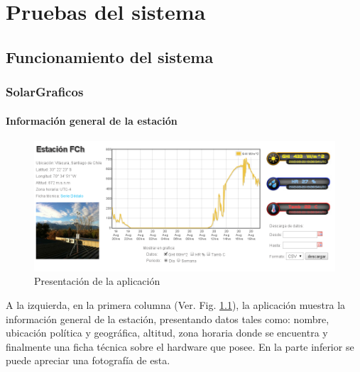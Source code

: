\chapter{Pruebas del sistema}
\label{pruebas}

\section{Funcionamiento del sistema}
\subsection{SolarGraficos}
\subsubsection{Información general de la estación}
\begin{figure}[h]
	\centering
	\includegraphics[scale=0.42]{./images/cap5chap1img0}
	\caption{Presentación de la aplicación}
	\label{graficoPresentacion}
\end{figure}
A la izquierda, en la primera columna (Ver. Fig. \ref{graficoPresentacion}), la aplicación muestra la información general de la estación, presentando datos tales como: nombre, ubicación política y geográfica, altitud, zona horaria donde se encuentra y finalmente una ficha técnica sobre el hardware que posee. En la parte inferior se puede apreciar una fotografía de esta.

